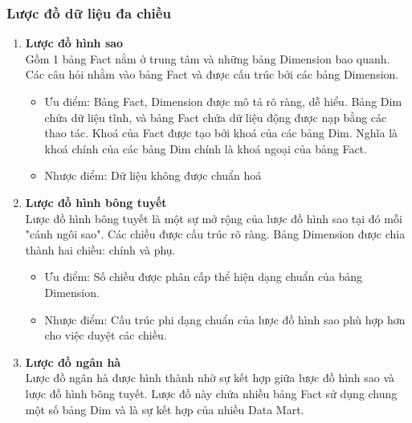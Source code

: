 \subsubsection{Lược đồ dữ liệu đa chiều}
\begin{enumerate}
\item \textbf{Lược đồ hình sao}\\
Gồm 1 bảng Fact nằm ở trung tâm và những bảng Dimension bao quanh. Các câu hỏi nhằm vào bảng Fact và được cấu trúc bởi các bảng Dimension.
\begin{itemize}
    \item  Ưu điểm: Bảng Fact, Dimension được mô tả rõ ràng, dễ hiểu. Bảng Dim chứa dữ liệu tĩnh, và bảng Fact chứa dữ liệu động được nạp bằng các thao tác. Khoá của Fact được tạo bởi khoá của các bảng Dim. Nghĩa là khoá chính của các bảng Dim chính là khoá ngoại của bảng Fact.
    \item Nhược điểm: Dữ liệu không được chuẩn hoá
\end{itemize}
\item \textbf{Lược đồ hình bông tuyết}\\
Lược đồ hình bông tuyết là một sự mở rộng của lược đồ hình sao tại đó mỗi "cánh ngôi sao". Các chiều được cấu trúc rõ ràng. Bảng Dimension được chia thành hai chiều: chính và phụ.
\begin{itemize}
    \item Ưu điểm: Số chiều được phân cấp thể hiện dạng chuẩn của bảng Dimension.
    \item Nhược điểm: Cấu trúc phi dạng chuẩn của lược đồ hình sao phù hợp hơn cho việc duyệt các chiều.
\end{itemize}
\item \textbf{Lược đồ ngân hà}\\
Lược đồ ngân hà được hình thành nhờ sự kết hợp giữa lược đồ hình sao và lược đồ hình bông tuyết. Lược đồ này chứa nhiều bảng Fact sử dụng chung một số bảng Dim và là sự kết hợp của nhiều Data Mart.
\end{enumerate}
